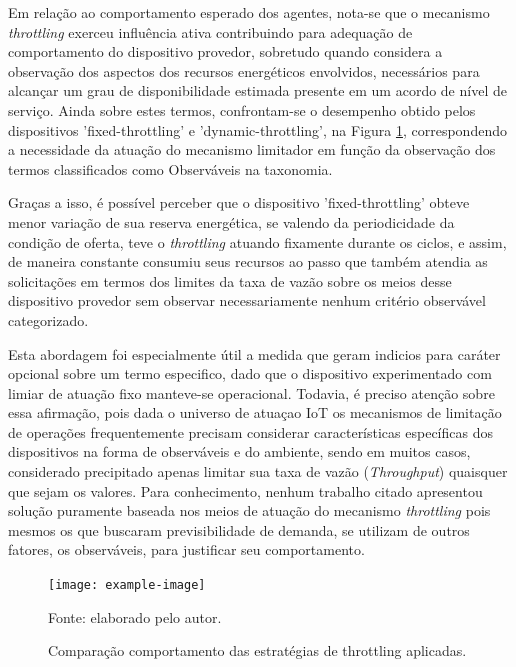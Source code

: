 Em relação ao comportamento esperado dos agentes, nota-se que o mecanismo \textit{throttling} exerceu influência ativa contribuindo para adequação de comportamento do dispositivo provedor, sobretudo quando considera a observação dos aspectos dos recursos energéticos envolvidos, necessários para alcançar um grau de disponibilidade estimada presente em um acordo de nível de serviço. Ainda sobre estes termos, confrontam-se o desempenho obtido pelos dispositivos 'fixed-throttling' e 'dynamic-throttling', na Figura \ref{fig:cap6fixedxdynamic}, correspondendo a necessidade da atuação do mecanismo limitador em função da observação dos termos classificados como Observáveis na taxonomia.

Graças a isso, é possível perceber que o dispositivo 'fixed-throttling' obteve menor variação de sua reserva energética, se valendo da periodicidade da condição de oferta, teve o \textit{throttling} atuando fixamente durante os ciclos, e assim, de maneira constante consumiu seus recursos ao passo que também atendia as solicitações em termos dos limites da taxa de vazão sobre os meios desse dispositivo provedor sem observar necessariamente nenhum critério observável categorizado.

Esta abordagem foi especialmente útil a medida que geram indicios para caráter opcional sobre um termo especifico, dado que o dispositivo experimentado com limiar de atuação fixo manteve-se operacional. Todavia, é preciso atenção sobre essa afirmação, pois dada o universo de atuaçao \acs{IoT} os mecanismos de limitação de operações frequentemente precisam considerar características específicas dos dispositivos na forma de observáveis e do ambiente, sendo em muitos casos, considerado precipitado apenas limitar sua taxa de vazão (\textit{Throughput}) quaisquer que sejam os valores. Para conhecimento, nenhum trabalho citado apresentou solução puramente baseada nos meios de atuação do mecanismo \textit{throttling} pois mesmos os que buscaram previsibilidade de demanda, se utilizam de outros fatores, os observáveis, para justificar seu comportamento.
 
\begingroup
\begin{figure}[htb]
	
	\centering
	\caption{Comparação comportamento das estratégias de throttling aplicadas.}
	\label{fig:cap6fixedxdynamic}
	\noindent\texttt{[image: example-image]} 
	
	Fonte: elaborado pelo autor.
\end{figure}
\endgroup

